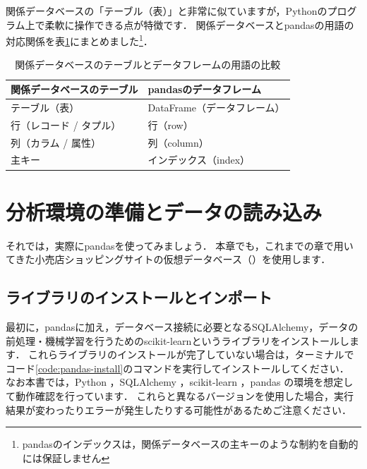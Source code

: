 関係データベースの「テーブル（表）」と非常に似ていますが，Pythonのプログラム上で柔軟に操作できる点が特徴です．
関係データベースとpandasの用語の対応関係を表\ref{tab:pandas-df-vs-table}にまとめました\footnote{pandasのインデックスは，関係データベースの主キーのような制約を自動的には保証しません}．

\begin{table}[!htbp]
    \centering
    \caption{関係データベースのテーブルとデータフレームの用語の比較}
    \begin{tabular}{ll}
    \toprule
    \textbf{関係データベースのテーブル} & \textbf{pandasのデータフレーム} \\ \midrule
    テーブル（表）       & DataFrame（データフレーム） \\
    行（レコード / タプル）       & 行（row）\\
    列（カラム / 属性）         & 列（column）\\
    主キー               & インデックス（index）\\ \bottomrule
    \end{tabular}
    \label{tab:pandas-df-vs-table}
\end{table}


\section{分析環境の準備とデータの読み込み}
それでは，実際にpandasを使ってみましょう．
本章でも，これまでの章で用いてきた小売店ショッピングサイトの仮想データベース（）を使用します．

\subsection{ライブラリのインストールとインポート}\label{sec:pandas-install}
最初に，pandasに加え，データベース接続に必要となるSQLAlchemy，データの前処理・機械学習を行うためのscikit-learnというライブラリをインストールします．
これらライブラリのインストールが完了していない場合は，ターミナルでコード\ref{code:pandas-install}のコマンドを実行してインストールしてください．
なお本書では，Python ，SQLAlchemy ，scikit-learn ，pandas の環境を想定して動作確認を行っています．
これらと異なるバージョンを使用した場合，実行結果が変わったりエラーが発生したりする可能性があるためご注意ください．

